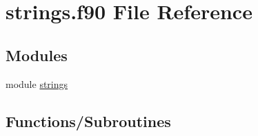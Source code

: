 \hypertarget{strings_8f90}{}\section{strings.\+f90 File Reference}
\label{strings_8f90}
\subsection*{Modules}
\begin{DoxyCompactItemize}
\item 
module \mbox{\hyperlink{namespacestrings}{strings}}
\end{DoxyCompactItemize}
\subsection*{Functions/\+Subroutines}
